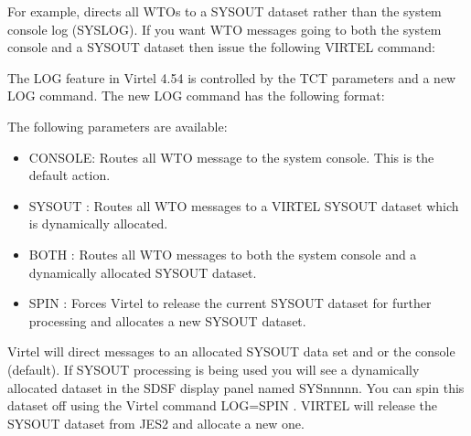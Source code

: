 \documentclass[letterpaper,10pt,english]{sphinxmanual}
\begin{document}
For example,  directs all WTOs to a SYSOUT dataset rather than the system console log (SYSLOG). If you want WTO messages going to both the system console and a SYSOUT dataset then issue the following VIRTEL command:

\begin{sphinxVerbatim}[commandchars=\\\{\}]
 
\end{sphinxVerbatim}

\ignorespaces 
The LOG feature in Virtel 4.54 is controlled by the TCT parameters and a new LOG command. The new LOG command has the following format:

\begin{sphinxVerbatim}[commandchars=\\\{\}]
        
\end{sphinxVerbatim}


The following parameters are available:
\begin{itemize}
\item {} 
CONSOLE: Routes all WTO message to the system console. This is the default action.

\item {} 
SYSOUT : Routes all WTO messages to a VIRTEL SYSOUT dataset which is dynamically allocated.

\item {} 
BOTH : Routes all WTO messages to both the system console and a dynamically allocated SYSOUT dataset.

\item {} 
SPIN : Forces Virtel to release the current SYSOUT dataset for further processing and allocates a new SYSOUT dataset.

\end{itemize}

Virtel will direct messages to an allocated SYSOUT data set and \textbar{} or the console (default). If SYSOUT processing is being used you will see a dynamically allocated dataset in the SDSF display panel named SYSnnnnn. You can spin this dataset off using the Virtel command LOG=SPIN . VIRTEL will release the SYSOUT dataset from JES2 and allocate a new one.
\end{document}
